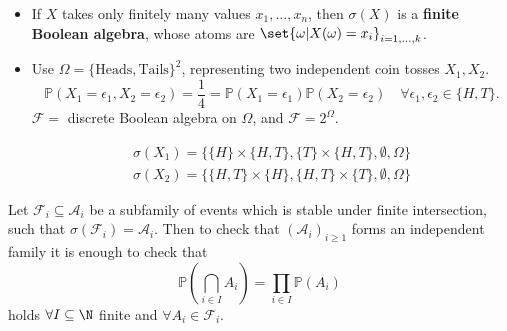 \documentclass{article}
\newcommand{\1}[1]{\mathbbm{1}_{#1}}
\newcommand{\Prob}{\mathbb{P}}
\begin{document}
\begin{eg}
    \leavevmode
    \begin{itemize}
        \item If $X$ takes only finitely many values $x_1, \dotsc, x_n$, then $\sigma(X)$ is a \textbf{finite Boolean algebra}, whose atoms are $\set{\omega | X(\omega) = x_i}_{i=1,\dotsc,k}$.
        \item Use $\Omega=\{\text{Heads},\text{Tails}\}^2$, representing two independent coin tosses $X_1, X_2$.
            \begin{equation*}
                \Prob(X_1 = \epsilon_1, X_2 = \epsilon_2) = \frac{1}{4} = \Prob(X_1 = \epsilon_1) \Prob(X_2 = \epsilon_2) \quad \forall \epsilon_1, \epsilon_2 \in \{H, T\}.
            \end{equation*}
            $\mathcal{F}=$ discrete Boolean algebra on $\Omega$, and $\mathcal{F}=2^\Omega$.
            \begin{center}
            \end{center}
            \begin{align*}
                \sigma(X_1)= \{\{H\} \times \{H, T\}, \{T\} \times \{H, T\}, \emptyset, \Omega\} \\
                \sigma(X_2)= \{\{H, T\} \times \{H\}, \{H, T\} \times \{T\}, \emptyset, \Omega\}
            \end{align*}
    \end{itemize}
\end{eg}

\begin{lemma}
    Let $\mathcal{F}_i \subseteq \mathcal{A}_i$ be a subfamily of events which is stable under finite intersection, such that $\sigma(\mathcal{F}_i) = \mathcal{A}_i$.
    Then to check that $(\mathcal{A}_i)_{i \geq 1}$ forms an independent family it is enough to check that
    \begin{equation*}
        \Prob\left(\bigcap_{i \in I} A_i\right) = \prod_{i \in I} \Prob(A_i)
    \end{equation*}
    holds $\forall I \subseteq \N$ finite and $\forall A_i \in \mathcal{F}_i$.
\end{lemma}
\end{document}
